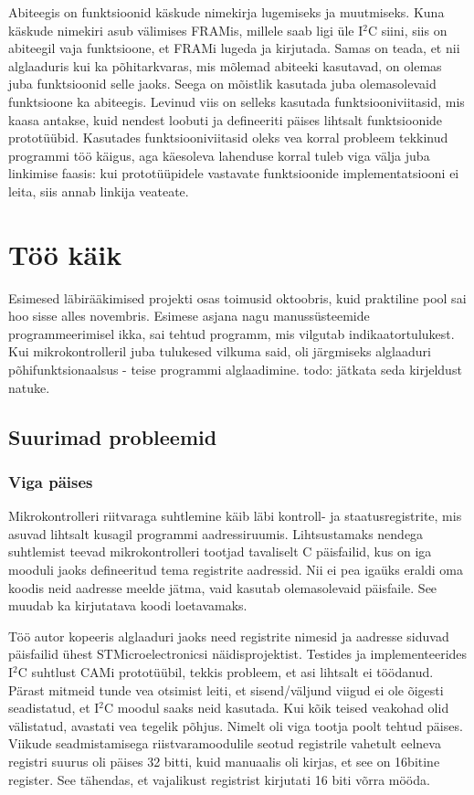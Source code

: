 \documentclass[12pt,a4paper]{article}
\newcommand{\iic}{I${}^2$C }
\begin{document}
Abiteegis on funktsioonid käskude nimekirja lugemiseks ja muutmiseks. Kuna
käskude nimekiri asub välimises FRAMis, millele saab ligi üle \iic siini, siis
on abiteegil vaja funktsioone, et FRAMi lugeda ja kirjutada. Samas on teada, et
nii alglaaduris kui ka põhitarkvaras, mis mõlemad abiteeki kasutavad, on olemas
juba funktsioonid selle jaoks. Seega on mõistlik kasutada juba olemasolevaid
funktsioone ka abiteegis. Levinud viis on selleks kasutada funktsiooniviitasid,
mis kaasa antakse, kuid nendest loobuti ja defineeriti päises lihtsalt
funktsioonide prototüübid. Kasutades funktsiooniviitasid oleks vea korral
probleem tekkinud programmi töö käigus, aga käesoleva lahenduse korral tuleb
viga välja juba linkimise faasis: kui prototüüpidele vastavate funktsioonide
implementatsiooni ei leita, siis annab linkija veateate.

\section{Töö käik}
Esimesed läbirääkimised projekti osas toimusid oktoobris, kuid praktiline pool
sai hoo sisse alles novembris. Esimese asjana nagu manussüsteemide
programmeerimisel ikka, sai tehtud programm, mis vilgutab indikaatortulukest.
Kui mikrokontrolleril juba tulukesed vilkuma said, oli järgmiseks alglaaduri
põhifunktsionaalsus - teise programmi alglaadimine. todo: jätkata seda kirjeldust
natuke.

\subsection{Suurimad probleemid}
\subsubsection{Viga päises}
Mikrokontrolleri riitvaraga suhtlemine käib läbi kontroll- ja staatusregistrite,
mis asuvad lihtsalt kusagil programmi aadressiruumis. Lihtsustamaks nendega
suhtlemist teevad mikrokontrolleri tootjad tavaliselt C päisfailid, kus on iga
mooduli jaoks defineeritud tema registrite aadressid. Nii ei pea igaüks eraldi
oma koodis neid aadresse meelde jätma, vaid kasutab olemasolevaid päisfaile. See
muudab ka kirjutatava koodi loetavamaks.

Töö autor kopeeris alglaaduri jaoks need registrite nimesid ja aadresse siduvad
päisfailid ühest STMicroelectronicsi näidisprojektist. Testides ja
implementeerides \iic suhtlust CAMi prototüübil, tekkis probleem, et asi
lihtsalt ei töödanud. Pärast mitmeid tunde vea otsimist leiti, et
sisend/väljund viigud ei ole õigesti seadistatud, et \iic moodul saaks neid
kasutada. Kui kõik teised veakohad olid välistatud, avastati vea tegelik põhjus.
Nimelt oli viga tootja poolt tehtud päises. Viikude seadmistamisega
riistvaramoodulile seotud registrile vahetult eelneva registri suurus oli päises
32 bitti, kuid manuaalis oli kirjas, et see on 16bitine register. See tähendas,
et vajalikust registrist kirjutati 16 biti võrra mööda. 
\end{document}
